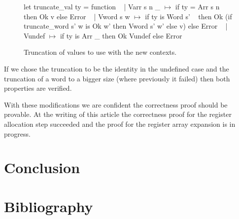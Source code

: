 \documentclass{article}
\begin{document}
\begin{figure}[t]
\obeylines\obeyspaces\ttfamily%
let truncate\_val ty = function
~ | Varr s n \_ \(\mapsto\) if ty = Arr s n then Ok v else Error
~ | Vword s w  \(\mapsto\) if ty is Word s'
~   then Ok (if truncate\_word s' w is Ok w' then Vword s' w' else v) else Error
~ | Vundef     \(\mapsto\) if ty is Arr \_ then Ok Vundef else Error
\normalfont%
\caption{Truncation of values to use with the new contexts.}
\end{figure}

If we chose the truncation to be the identity in the undefined case and the
truncation of a word to a bigger size (where previously it failed) then both
properties are verified.

\medskip

With these modifications we are confident the correctness proof should be
provable. At the writing of this article the correctness proof for the register
allocation step succeeded and the proof for the register array expansion is in
progress.

\section{Conclusion}\label{sec:ccl}

\section{Bibliography}


\end{document}
